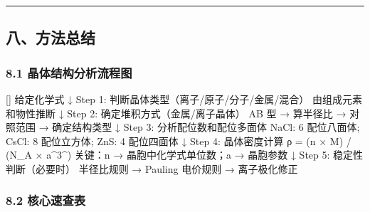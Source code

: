 \documentclass[a4paper,11pt]{ctexart}
\newenvironment{Shaded}{}{}
\newenvironment{Highlighting}{}{}
\newcommand{\NormalTok}[1]{#1}
\begin{document}
\begin{center}\rule{0.5\linewidth}{0.5pt}\end{center}

\subsection{八、方法总结}\label{ux516bux65b9ux6cd5ux603bux7ed3}

\subsubsection{8.1 晶体结构分析流程图}\label{ux6676ux4f53ux7ed3ux6784ux5206ux6790ux6d41ux7a0bux56fe}

\begin{Shaded}
\begin{Highlighting}[]
\NormalTok{给定化学式}
\NormalTok{   ↓}
\NormalTok{Step 1: 判断晶体类型（离子/原子/分子/金属/混合）}
\NormalTok{   由组成元素和物性推断}
\NormalTok{   ↓}
\NormalTok{Step 2: 确定堆积方式（金属/离子晶体）}
\NormalTok{   AB 型 → 算半径比 → 对照范围 → 确定结构类型}
\NormalTok{   ↓}
\NormalTok{Step 3: 分析配位数和配位多面体}
\NormalTok{   NaCl: 6 配位八面体; CsCl: 8 配位立方体; ZnS: 4 配位四面体}
\NormalTok{   ↓}
\NormalTok{Step 4: 晶体密度计算}
\NormalTok{   ρ = (n × M) / (N\_A × a\^{}3\^{})}
\NormalTok{   关键：n → 晶胞中化学式单位数；a → 晶胞参数}
\NormalTok{   ↓}
\NormalTok{Step 5: 稳定性判断（必要时）}
\NormalTok{   半径比规则 → Pauling 电价规则 → 离子极化修正}
\end{Highlighting}
\end{Shaded}

\subsubsection{8.2 核心速查表}\label{ux6838ux5fc3ux901fux67e5ux8868}
\end{document}
